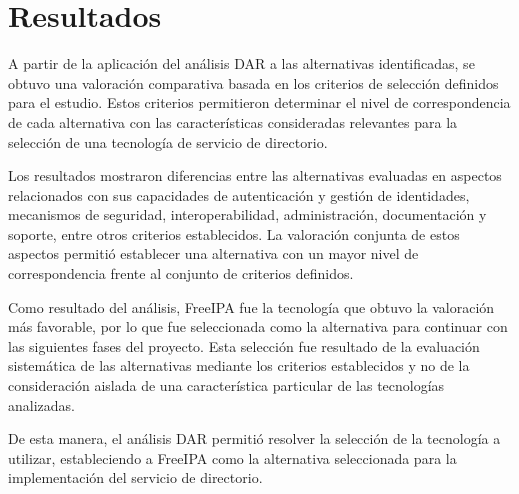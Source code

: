 \section{Resultados}\label{sec:dar-resultados}

A partir de la aplicación del análisis \ac{DAR} a las alternativas identificadas, se obtuvo una valoración comparativa basada en los criterios de selección definidos para el estudio. Estos criterios permitieron determinar el nivel de correspondencia de cada alternativa con las características consideradas relevantes para la selección de una tecnología de servicio de directorio.

Los resultados mostraron diferencias entre las alternativas evaluadas en aspectos relacionados con sus capacidades de autenticación y gestión de identidades, mecanismos de seguridad, interoperabilidad, administración, documentación y soporte, entre otros criterios establecidos. La valoración conjunta de estos aspectos permitió establecer una alternativa con un mayor nivel de correspondencia frente al conjunto de criterios definidos.

Como resultado del análisis, FreeIPA fue la tecnología que obtuvo la valoración más favorable, por lo que fue seleccionada como la alternativa para continuar con las siguientes fases del proyecto. Esta selección fue resultado de la evaluación sistemática de las alternativas mediante los criterios establecidos y no de la consideración aislada de una característica particular de las tecnologías analizadas.

De esta manera, el análisis \ac{DAR} permitió resolver la selección de la tecnología a utilizar, estableciendo a FreeIPA como la alternativa seleccionada para la implementación del servicio de directorio.
